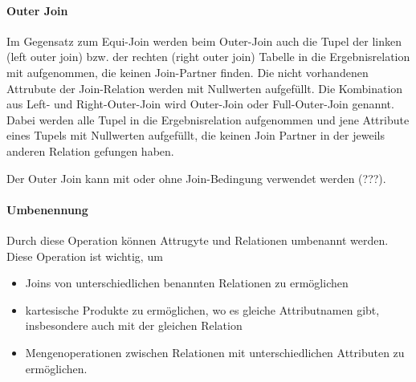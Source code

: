 \documentclass{scrbook}
\begin{document}
% 
%
%
%
%


\paragraph{Outer Join}

Im Gegensatz zum Equi-Join werden beim Outer-Join auch die Tupel der linken
(left outer join) bzw. der rechten (right outer join) Tabelle in die
Ergebnisrelation mit aufgenommen, die keinen Join-Partner finden.  Die nicht
vorhandenen Attrubute der Join-Relation werden mit Nullwerten aufgefüllt.  Die
Kombination aus Left- und Right-Outer-Join wird Outer-Join oder Full-Outer-Join
genannt.
Dabei werden alle Tupel in die Ergebnisrelation aufgenommen und jene Attribute
eines Tupels mit Nullwerten aufgefüllt, die keinen Join Partner
in der jeweils anderen Relation gefungen haben.

Der Outer Join kann mit oder ohne Join-Bedingung verwendet werden (???).


% 
%
%




\paragraph{Umbenennung}

Durch diese Operation können Attrugyte und Relationen umbenannt werden.
Diese Operation ist wichtig, um
\begin{itemize}
\item Joins von unterschiedlichen benannten Relationen zu ermöglichen
\item kartesische Produkte zu ermöglichen, wo es gleiche Attributnamen gibt,
	insbesondere auch mit der gleichen Relation
\item Mengenoperationen zwischen Relationen mit unterschiedlichen Attributen zu ermöglichen.
\end{itemize}
\end{document}
